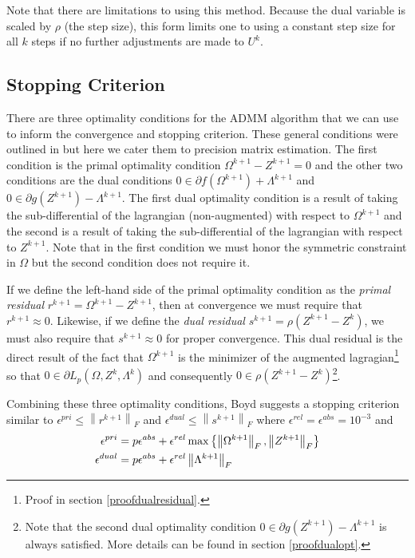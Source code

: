 \documentclass[11pt,]{report}
\theoremstyle{definition}
\theoremstyle{definition}
\theoremstyle{definition}
\theoremstyle{remark}
\begin{document}
Note that there are limitations to using this method. Because the dual variable is scaled by \(\rho\) (the step size), this form limits one to using a constant step size for all \(k\) steps if no further adjustments are made to \(U^{k}\).

\hypertarget{ADMMstop}{%
\subsection{Stopping Criterion}\label{ADMMstop}}

There are three optimality conditions for the ADMM algorithm that we can use to inform the convergence and stopping criterion. These general conditions were outlined in \citet{boyd2011distributed} but here we cater them to precision matrix estimation. The first condition is the primal optimality condition \(\Omega^{k + 1} - Z^{k + 1} = 0\) and the other two conditions are the dual conditions \(0 \in \partial f\left(\Omega^{k + 1}\right) + \Lambda^{k + 1}\) and \(0 \in \partial g\left(Z^{k + 1}\right) - \Lambda^{k + 1}\). The first dual optimality condition is a result of taking the sub-differential of the lagrangian (non-augmented) with respect to \(\Omega^{k + 1}\) and the second is a result of taking the sub-differential of the lagrangian with respect to \(Z^{k + 1}\). Note that in the first condition we must honor the symmetric constraint in \(\Omega\) but the second condition does not require it.

If we define the left-hand side of the primal optimality condition as the \emph{primal residual} \(r^{k + 1} = \Omega^{k + 1} - Z^{k + 1}\), then at convergence we must require that \(r^{k + 1} \approx 0\). Likewise, if we define the \emph{dual residual} \(s^{k + 1} = \rho\left( Z^{k + 1} - Z^{k} \right)\), we must also require that \(s^{k + 1} \approx 0\) for proper convergence. This dual residual is the direct result of the fact that \(\Omega^{k + 1}\) is the minimizer of the augmented lagragian\footnote{Proof in section \ref{proofdualresidual}.} so that \(0 \in \partial L_{p}\left( \Omega, Z^{k}, \Lambda^{k} \right)\) and consequently \(0 \in \rho\left( Z^{k + 1} - Z^{k} \right)\)\footnote{Note that the second dual optimality condition \(0 \in \partial g\left(Z^{k + 1}\right) - \Lambda^{k + 1}\) is always satisfied. More details can be found in section \ref{proofdualopt}.}.

Combining these three optimality conditions, Boyd suggests a stopping criterion similar to \(\epsilon^{pri} \leq \left\| r^{k + 1} \right\|_{F}\) and \(\epsilon^{dual} \leq \left\| s^{k + 1} \right\|_{F}\) where \(\epsilon^{rel} = \epsilon^{abs} = 10^{-3}\) and
\begin{equation}
\begin{split}
  \epsilon^{pri} &= p\epsilon^{abs} + \epsilon^{rel}\max\left\{ \left\| \Omega^{k + 1} \right\|_{F}, \left\| Z^{k + 1} \right\|_{F} \right\} \\
  \epsilon^{dual} &= p\epsilon^{abs} + \epsilon^{rel}\left\| \Lambda^{k + 1} \right\|_{F}
\label{eq:admmstopping}\notag
\end{split}
\end{equation}
\end{document}
